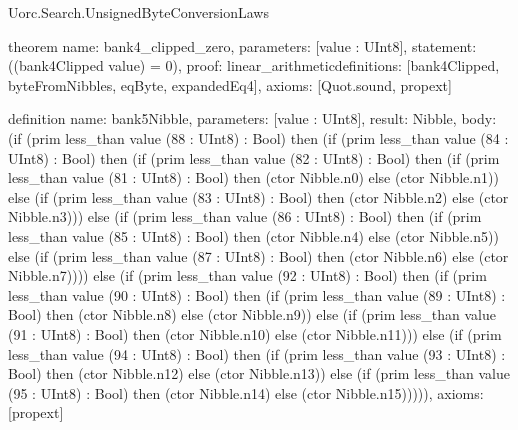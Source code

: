\begin{lexlean}{Uorc.Search.UnsignedByteConversionLaws}
\begin{semanticmodule}
theorem{
  name: bank4_clipped_zero,
  parameters: [value : UInt8],
  statement: ((bank4Clipped value) = 0),
  proof: linear_arithmetic{definitions: [bank4Clipped, byteFromNibbles, eqByte, expandedEq4]},
  axioms: [Quot.sound, propext]
}

definition{
  name: bank5Nibble,
  parameters: [value : UInt8],
  result: Nibble,
  body: (if (prim less_than value (88 : UInt8) : Bool) then (if (prim less_than value (84 : UInt8) : Bool) then (if (prim less_than value (82 : UInt8) : Bool) then (if (prim less_than value (81 : UInt8) : Bool) then (ctor Nibble.n0) else (ctor Nibble.n1)) else (if (prim less_than value (83 : UInt8) : Bool) then (ctor Nibble.n2) else (ctor Nibble.n3))) else (if (prim less_than value (86 : UInt8) : Bool) then (if (prim less_than value (85 : UInt8) : Bool) then (ctor Nibble.n4) else (ctor Nibble.n5)) else (if (prim less_than value (87 : UInt8) : Bool) then (ctor Nibble.n6) else (ctor Nibble.n7)))) else (if (prim less_than value (92 : UInt8) : Bool) then (if (prim less_than value (90 : UInt8) : Bool) then (if (prim less_than value (89 : UInt8) : Bool) then (ctor Nibble.n8) else (ctor Nibble.n9)) else (if (prim less_than value (91 : UInt8) : Bool) then (ctor Nibble.n10) else (ctor Nibble.n11))) else (if (prim less_than value (94 : UInt8) : Bool) then (if (prim less_than value (93 : UInt8) : Bool) then (ctor Nibble.n12) else (ctor Nibble.n13)) else (if (prim less_than value (95 : UInt8) : Bool) then (ctor Nibble.n14) else (ctor Nibble.n15))))),
  axioms: [propext]
}


\end{semanticmodule}
\end{lexlean}
